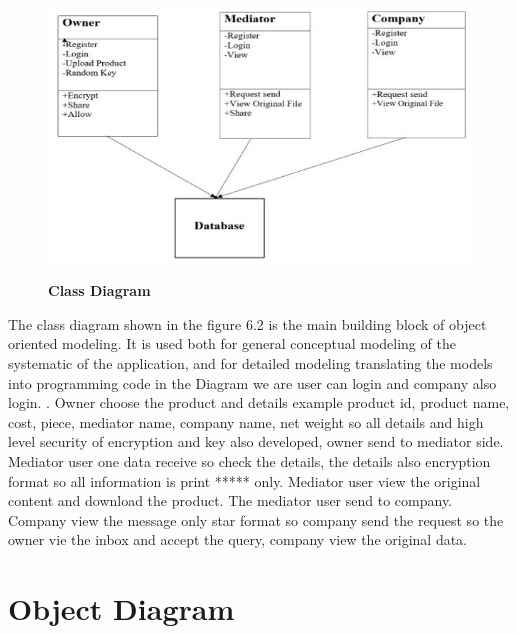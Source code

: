 \documentclass[BTech]{srmuthesis}
\begin{document}
\begin{figure}[H]
\centering
\includegraphics[scale=0.8]{class.jpg}
\label{fig:1}\hspace{10mm}
\caption{\textbf{Class Diagram}}
\end{figure}
The class diagram shown in the figure 6.2 is the main building block of object oriented modeling. It is used both for general conceptual modeling of the systematic of the application, and for detailed modeling translating the models into programming code in the Diagram we are user can login and company also login. .     Owner choose the product and details example product id, product name, cost, piece, mediator name, company name, net weight so all details and high level security of encryption and key also developed,  owner  send to mediator side. Mediator user one data receive so check the details, the details also encryption format so all information is print ***** only.    Mediator user view the original content and download the product. The mediator user send to company. Company view the message only star format so company send the request so the owner vie the inbox and accept the query, company view the original data.

\section{Object Diagram}
\end{document}
